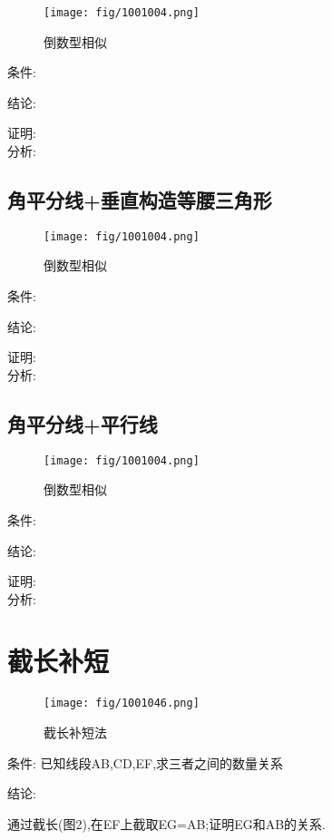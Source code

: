 \documentclass[cn,blue,10pt]{elegantbook}
\begin{document}
\begin{figure}[h]
    \centering
    \texttt{[image: fig/1001004.png]}
    \caption{倒数型相似}%
    \label{fig:倒数型相似}
\end{figure}
条件: \(\) 

结论: \( \) 

证明:\\

分析: 
\subsection{角平分线+垂直构造等腰三角形}%
\label{sub:角平分线_垂直构造等腰三角形}

\begin{figure}[h]
    \centering
    \texttt{[image: fig/1001004.png]}
    \caption{倒数型相似}%
    \label{fig:倒数型相似}
\end{figure}
条件: \(\) 

结论: \( \) 

证明:\\

分析: 
\subsection{角平分线+平行线}%
\label{sub:角平分线_平行线}

\begin{figure}[h]
    \centering
    \texttt{[image: fig/1001004.png]}
    \caption{倒数型相似}%
    \label{fig:倒数型相似}
\end{figure}
条件: \(\) 

结论: \( \) 

证明:\\

分析: 





\section{截长补短}%
\label{sec:截长补短}

\begin{figure}[h]
    \centering
    \texttt{[image: fig/1001046.png]}
    \caption{截长补短法}%
    \label{fig:倒数型相似}
\end{figure}
条件: 已知线段AB,CD,EF,求三者之间的数量关系 

结论:

通过截长(图2),在EF上截取EG=AB;证明EG和AB的关系.
\end{document}
